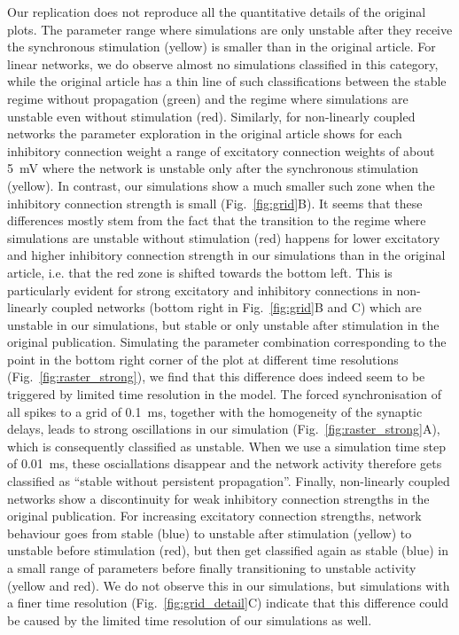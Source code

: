 \documentclass[10pt,a4paper,onecolumn]{article}
\begin{document}
Our replication does not reproduce all the quantitative details of the original plots. The parameter range where simulations are only unstable after they receive the synchronous stimulation (yellow) is smaller than in the original article. For linear networks, we do observe almost no simulations classified in this category, while the original article has a thin line of such classifications between the stable regime without propagation (green) and the regime where simulations are unstable even without stimulation (red). Similarly, for non-linearly coupled networks the parameter exploration in the original article shows for each inhibitory connection weight a range of excitatory connection weights of about \SI{5}{\milli\volt} where the network is unstable only after the synchronous stimulation (yellow). In contrast, our simulations show a much smaller such zone when the inhibitory connection strength is small (Fig.~\ref{fig:grid}B). It seems that these differences mostly stem from the fact that the transition to the regime where simulations are unstable without stimulation (red) happens for lower excitatory and higher inhibitory connection strength in our simulations than in the original article, i.e. that the red zone is shifted towards the bottom left. This is particularly evident for strong excitatory and inhibitory connections in non-linearly coupled networks (bottom right in Fig.~\ref{fig:grid}B and C) which are unstable in our simulations, but stable or only unstable after stimulation in the original publication. Simulating the parameter combination corresponding to the point in the bottom right corner of the plot at different time resolutions (Fig.~\ref{fig:raster_strong}), we find that this difference does indeed seem to be triggered by limited time resolution in the model. The forced synchronisation of all spikes to a grid of \SI{0.1}{\milli\second}, together with the homogeneity of the synaptic delays, leads to strong oscillations in our simulation (Fig.~\ref{fig:raster_strong}A), which is consequently classified as unstable. When we use a simulation time step of \SI{0.01}{\milli\second}, these osciallations disappear and the network activity therefore gets classified as ``stable without persistent propagation''.  Finally, non-linearly coupled networks show a discontinuity for weak inhibitory connection strengths in the original publication. For increasing excitatory connection strengths, network behaviour goes from stable (blue) to unstable after stimulation (yellow) to unstable before stimulation (red), but then get classified again as stable (blue) in a small range of parameters before finally transitioning to unstable activity (yellow and red). We do not observe this in our simulations, but simulations with a finer time resolution (Fig.~\ref{fig:grid_detail}C) indicate that this difference could be caused by the limited time resolution of our simulations as well.
\end{document}
